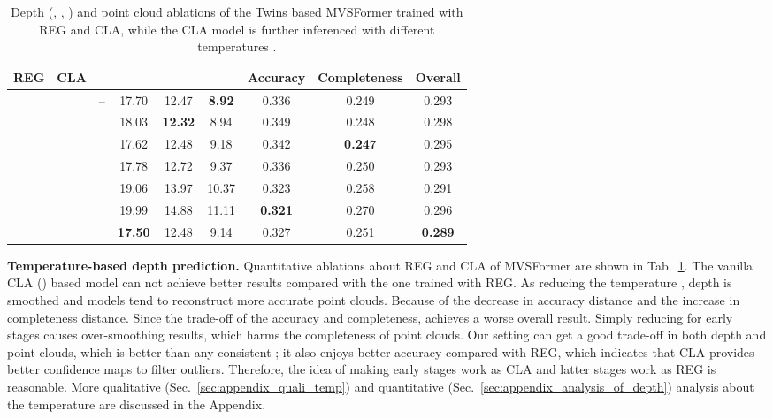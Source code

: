 \documentclass[10pt]{article} \usepackage[preprint]{tmlr}
\begin{document}
\begin{table}  
\centering  
\caption{Depth (, , ) and point cloud  ablations of the Twins based MVSFormer trained with REG and CLA, while the CLA model is further inferenced with different temperatures . \label{tab:ablation_cls_t}}
\vspace{-0.1in}
\begin{tabular}{c|c|c|ccc|ccc}
\hline 
{\small{}REG} & {\small{}CLA} &  & {\small{}} & {\small{} } & {\small{}} & {\small{}Accuracy} & {\small{}Completeness} & {\small{}Overall}\tabularnewline
\hline 
{\small{}} &  & {\small{}--} & {\small{}17.70} & {\small{}12.47} & \textbf{\small{}8.92} & {\small{}0.336} & {\small{}0.249} & {\small{}0.293}\tabularnewline
\hline 
 & {\small{}} & {\small{}} & {\small{}18.03} & \textbf{\small{}12.32} & {\small{}8.94} & {\small{}0.349} & {\small{}0.248} & {\small{}0.298}\tabularnewline
 & {\small{}} & {\small{}} & {\small{}17.62} & {\small{}12.48} & {\small{}9.18} & {\small{}0.342} & \textbf{\small{}0.247} & {\small{}0.295}\tabularnewline
 & {\small{}} & {\small{}} & {\small{}17.78} & {\small{}12.72} & {\small{}9.37} & {\small{}0.336} & {\small{}0.250} & {\small{}0.293}\tabularnewline
 & {\small{}} & {\small{}} & {\small{}19.06} & {\small{}13.97} & {\small{}10.37} & {\small{}0.323} & {\small{}0.258} & {\small{}0.291}\tabularnewline
 & {\small{}} & {\small{}} & {\small{}19.99} & {\small{}14.88} & {\small{}11.11} & \textbf{\small{}0.321} & {\small{}0.270} & {\small{}0.296}\tabularnewline
 & {\small{}} &  & \textbf{\small{}17.50} & {\small{}12.48} & {\small{}9.14} & {\small{}0.327} & {\small{}0.251} & \textbf{\small{}0.289}\tabularnewline
\hline 
\end{tabular}
\vspace{-0.1in}
\end{table}

\noindent\textbf{Temperature-based depth prediction.}
Quantitative ablations about REG and CLA of MVSFormer are shown in Tab.~\ref{tab:ablation_cls_t}. The vanilla CLA () based model can not achieve better results compared with the one trained with REG. As reducing the temperature , depth is smoothed and models tend to reconstruct more accurate point clouds. Because of the decrease in accuracy distance and the increase in completeness distance. Since the trade-off of the accuracy and completeness,  achieves a worse overall result. Simply reducing  for early stages causes over-smoothing results, which harms the completeness of point clouds.
Our  setting can get a good trade-off in both depth and point clouds, which is better than any consistent ; it also enjoys better accuracy compared with REG, which indicates that CLA provides better confidence maps to filter outliers. Therefore, the idea of making early stages work as CLA and latter stages work as REG is reasonable. 
More qualitative (Sec.~\ref{sec:appendix_quali_temp}) and quantitative (Sec.~\ref{sec:appendix_analysis_of_depth}) analysis about the temperature are discussed in the Appendix.
\end{document}
